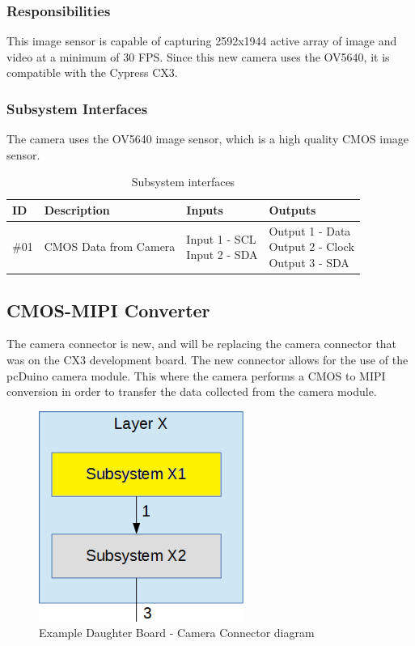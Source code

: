 \subsubsection{Responsibilities}
This image sensor is capable of capturing 2592x1944 active array of image and video at a minimum of 30 FPS. Since this new camera uses the OV5640, it is compatible with the Cypress CX3.

\subsubsection{Subsystem Interfaces}

The camera uses the OV5640 image sensor, which is a high quality CMOS image sensor.

\begin {table}[H]
\caption {Subsystem interfaces}
\begin{center}
    \begin{tabular}{ | p{1cm} | p{6cm} | p{3cm} | p{3cm} |}
    \hline
    ID & Description & Inputs & Outputs \\ \hline
    \#01 & CMOS Data from Camera & \pbox{3cm}{Input 1 - SCL \\ Input 2 - SDA} & \pbox{3cm}{Output 1 - Data \\ Output 2 - Clock \\ Output 3 - SDA}  \\ \hline
    \end{tabular}
\end{center}
\end{table}

\subsection{CMOS-MIPI Converter}
The camera connector is new, and will be replacing the camera connector that was on the CX3 development board. The new connector allows for the use of the pcDuino camera module. This where the camera performs a CMOS to MIPI conversion in order to transfer the data collected from the camera module.

\begin{figure}[h!]
	\centering
 	\includegraphics[width=0.60\textwidth]{images/subsystem}
 \caption{Example Daughter Board - Camera Connector diagram}
\end{figure}

